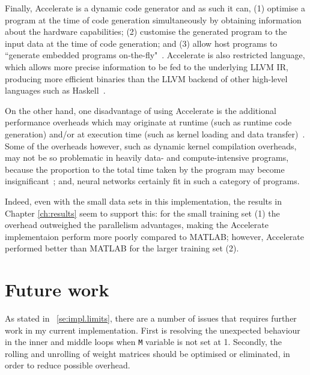 Finally, Accelerate is a dynamic code generator and as such it can, (1) optimise a program at the time of code generation simultaneously by obtaining information about the hardware capabilities; (2) customise the generated program to the input data at the time of code generation; and (3) allow host programs to ``generate embedded programs on-the-fly"~\cite{ChaKelLee11}. Accelerate is also restricted language, which allows more precise information to be fed to the underlying LLVM IR, producing more efficient binaries than the LLVM backend of other high-level languages such as Haskell~\cite{McDChaGro}. 

On the other hand, one disadvantage of using Accelerate is the additional performance overheads which may originate at runtime (such as runtime code generation) and/or at execution time (such as kernel loading and data transfer)~\cite{ChaKelLee11}. Some of the overheads however, such as dynamic kernel compilation overheads, may not be so problematic in heavily data- and compute-intensive programs, because the proportion to the total time taken by the program may become insignificant~\cite{ChaKelLee11}; and, neural networks certainly fit in such a category of programs. 

Indeed, even with the small data sets in this implementation, the results in Chapter \ref{ch:results} seem to support this: for the small training set (1) the overhead outweighed the parallelism advantages, making the Accelerate implementaion perform more poorly compared to MATLAB; however, Accelerate performed better than MATLAB for the larger training set (2).

\section{Future work} \label{se:eval.incomplete}

As stated in ~\ref{se:impl.limits}, there are a number of issues that requires further work in my current implementation. First is resolving the unexpected behaviour in the inner and middle loops when \texttt{M} variable is not set at 1. Secondly, the rolling and unrolling of weight matrices should be optimised or eliminated, in order to reduce possible overhead. 

